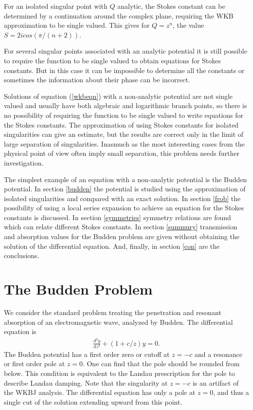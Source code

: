 \documentclass[aps,prl,preprint,superscriptaddress]{revtex4}
\begin{document}
For an isolated singular point with $Q$ analytic, the Stokes constant 
can be determined by a continuation around the complex plane, requiring the WKB approximation to be single valued.
This gives\cite[p.~83]{rwbook} for $Q = z^n$, the value $S = 2icos(\pi/(n+2))$.

For several singular points associated with an analytic potential it is still possible to require the function to be  single valued to obtain equations for Stokes constants. But in this case it can be impossible to determine all the constants or sometimes the information about their phase can be incorrect\cite[pp~243-245]{rwbook}.

Solutions of equation (\ref{wkbeqn}) with a non-analytic potential are not single valued and usually have both algebraic and logarithmic branch points, so there is no possibility of requiring the function to be single valued to write equations for the Stokes constants. The approximation of using Stokes constants  for isolated singularities can give an estimate, but the results are correct only in the limit of large separation of singularities. Inasmuch as the most interesting cases from the physical point of view often imply small separation, this problem needs further investigation.

The simplest example of an equation with a non-analytic potential is the Budden potential.
In section \ref{budden} the potential is studied using the approximation of isolated singularities and compared with an exact solution.  
In section \ref{frob} the possibility of using a local series expansion to achieve an equation for the Stokes constants is discussed. 
In section \ref{symmetries} symmetry relations are found which can relate different Stokes constants.
In section \ref{summury} transmission and absorption values for the Budden problem are given without obtaining the solution of the differential equation.
And, finally, in section \ref{con} are the conclusions. 

\section{The Budden Problem \label{budden}}

We consider the standard problem treating the penetration and resonant absorption of an electromagnetic wave, analyzed by Budden\cite{white-chen,budden}. The differential equation is
\begin{eqnarray}
\frac{d^2y}{dz^2} + (1+c/z)y = 0.  \label{budeq}
\end{eqnarray}
The Budden potential has a first order zero or cutoff  at \mbox{$z=-c$} and a resonance or first order pole at \mbox{$z=0$}. One can find that the pole should be rounded from below. This condition is equivalent to the Landau prescription for the pole to describe Landau
damping. Note that the singularity at \mbox{$z=-c$} is an artifact of the WKBJ
analysis. The differential equation has only a pole at \mbox{$z=0$}, and thus a
single cut of the solution extending upward from this point.
\end{document}
